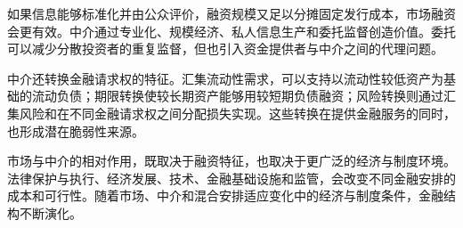 如果信息能够标准化并由公众评价，融资规模又足以分摊固定发行成本，市场融资会更有效。中介通过专业化、规模经济、私人信息生产和委托监督创造价值。委托可以减少分散投资者的重复监督，但也引入资金提供者与中介之间的代理问题。

中介还转换金融请求权的特征。汇集流动性需求，可以支持以流动性较低资产为基础的流动负债；期限转换使较长期资产能够用较短期负债融资；风险转换则通过汇集风险和在不同金融请求权之间分配损失实现。这些转换在提供金融服务的同时，也形成潜在脆弱性来源。

市场与中介的相对作用，既取决于融资特征，也取决于更广泛的经济与制度环境。法律保护与执行、经济发展、技术、金融基础设施和监管，会改变不同金融安排的成本和可行性。随着市场、中介和混合安排适应变化中的经济与制度条件，金融结构不断演化。



